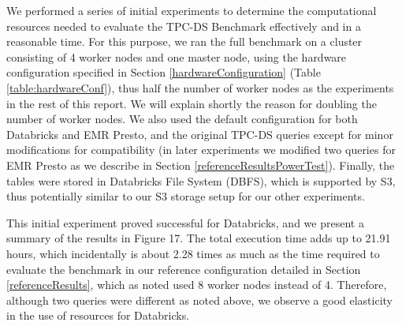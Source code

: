 We performed a series of initial experiments to determine the computational resources needed to evaluate the TPC-DS Benchmark effectively and in a reasonable time. For this purpose, we ran the full benchmark on a cluster consisting of 4 worker nodes and one master node, using the hardware configuration specified in Section \ref{hardwareConfiguration} (Table \ref{table:hardwareConf}), thus half the number of worker nodes as the experiments in the rest of this report. We will explain shortly the reason for doubling the number of worker nodes. We also used the default configuration for both Databricks and EMR Presto, and the original TPC-DS queries except for minor modifications for compatibility (in later experiments we modified two queries for EMR Presto as we describe in Section \ref{referenceResultsPowerTest}). Finally, the tables were stored in Databricks File System (DBFS), which is supported by S3, thus potentially similar to our S3 storage setup for our other experiments.

This initial experiment proved successful for Databricks, and we present a summary of the results in Figure 17. The total execution time adds up to 21.91 hours, which incidentally is about 2.28 times as much as the time required to evaluate the benchmark in our reference configuration detailed in Section \ref{referenceResults}, which as noted used 8 worker nodes instead of 4. Therefore, although two queries were different as noted above, we observe a good elasticity in the use of resources for Databricks.

